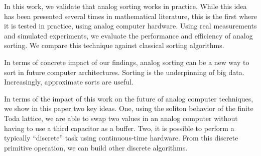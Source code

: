 In this work, we validate that analog sorting works in practice.
While this idea has been presented several times in mathematical literature, this is the first where it is tested in practice, using analog computer hardware.
Using real measurements and simulated experiments, we evaluate the performance and efficiency of analog sorting.
We compare this technique against classical sorting algorithms.

In terms of concrete impact of our findings, analog sorting can be a new way to sort in future computer architectures.
Sorting is the underpinning of big data.
Increasingly, approximate sorts are useful.

In terms of the impact of this work on the future of analog computer techniques, we show in this paper two key ideas.
One, using the soliton behavior of the finite Toda lattice, we are able to swap two values in an analog computer without having to use a third capacitor as a buffer.
Two, it is possible to perform a typically ``discrete'' task using continuous-time hardware.
From this discrete primitive operation, we can build other discrete algorithms.

